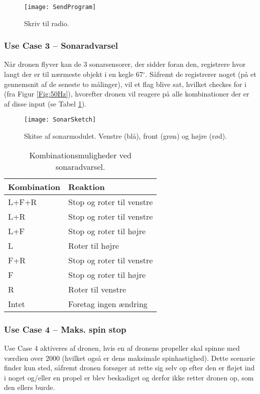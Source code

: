 \documentclass[Main]{subfiles}
\begin{document}
\begin{figure}[H]
\centering
\texttt{[image: SendProgram]}
\caption{Skriv til radio.}
\label{Fig:SendProgram}
\end{figure}


\newpage
\subsubsection{Use Case 3 -- Sonaradvarsel}
Når dronen flyver kan de 3 sonarsensorer, der sidder foran den, registrere hvor langt der er til nærmeste objekt i en kegle 67$^{\circ}$.
Såfremt de registrerer noget (på et gennemsnit af de seneste to målinger), vil et flag blive sat, hvilket checkes for i  (fra Figur \ref{Fig:50Hz}), hvorefter dronen vil reagere på alle kombinationer der er af disse input (se Tabel \ref{Tab:SonarAdvarsel}).


\begin{figure}[H]
\centering
\texttt{[image: SonarSketch]}
\caption{Skitse af sonarmodulet. Venstre (blå), front (grøn) og højre (rød).}
\label{Fig:SonarSketch}
\end{figure}

\begin{table}[H]
\centering
	\begin{tabular}{l l}
	\hline Kombination & Reaktion
	\\ \hline 
	L+F+R & Stop og roter til venstre \\
	L+R & Stop og roter til venstre\\
	L+F & Stop og roter til højre\\
	L & Roter til højre\\
	F+R & Stop og roter til venstre\\
	F & Stop og roter til højre\\
	R & Roter til venstre\\
	Intet & Foretag ingen ændring \\ \hline
	\end{tabular}
\caption{Kombinationsmuligheder ved sonaradvarsel.}
\label{Tab:SonarAdvarsel}
\end{table}

\newpage
\subsubsection{Use Case 4 -- Maks. spin stop}
Use Case 4 aktiveres af dronen, hvis en af dronens propeller skal spinne med værdien over 2000 (hvilket også er dens maksimale spinhastighed).
Dette scenarie finder kun sted, såfremt dronen forsøger at rette sig selv op efter den er fløjet ind i noget og/eller en propel er blev beskadiget og derfor ikke retter dronen op, som den ellers burde.
\end{document}
